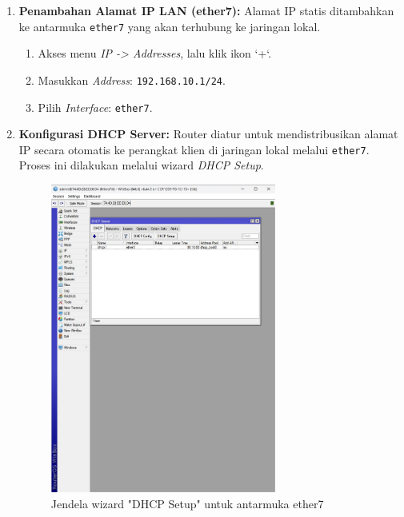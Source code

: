 \begin{enumerate}
    \item \textbf{Penambahan Alamat IP LAN (ether7):} Alamat IP statis ditambahkan ke antarmuka \texttt{ether7} yang akan terhubung ke jaringan lokal.
    \begin{enumerate}
        \item Akses menu \textit{IP -> Addresses}, lalu klik ikon `+`.
        \item Masukkan \textit{Address}: \texttt{192.168.10.1/24}.
        \item Pilih \textit{Interface}: \texttt{ether7}.
    \end{enumerate}
    
    \item \textbf{Konfigurasi DHCP Server:} Router diatur untuk mendistribusikan alamat IP secara otomatis ke perangkat klien di jaringan lokal melalui \texttt{ether7}. Proses ini dilakukan melalui wizard \textit{DHCP Setup}.
    \begin{figure}[H]
        \centering
        \includegraphics[width=0.7\textwidth]{img4/DHCPServer.jpeg}
        \caption{Jendela wizard "DHCP Setup" untuk antarmuka ether7}
    \end{figure}
    

\end{enumerate}
